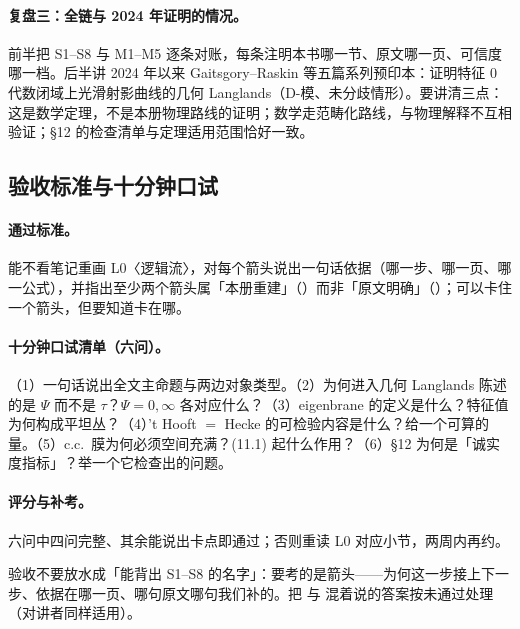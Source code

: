 {\paragraph{复盘三：全链与 2024 年证明的情况。}前半把 S1--S8 与 M1--M5 逐条对账，每条注明本书哪一节、原文哪一页、可信度哪一档。后半讲 2024 年以来 Gaitsgory--Raskin 等五篇系列预印本：证明特征 \(0\) 代数闭域上光滑射影曲线的几何 Langlands（D-模、未分歧情形）。要讲清三点：这是数学定理，不是本册物理路线的证明；数学走范畴化路线，与物理解释不互相验证；§12 的检查清单与定理适用范围恰好一致。\pC

\subsection{验收标准与十分钟口试}

\paragraph{通过标准。}能不看笔记重画 L0〈逻辑流〉，对每个箭头说出一句话依据（哪一步、哪一页、哪一公式），并指出至少两个箭头属「本册重建」（\pB）而非「原文明确」（\pA）；可以卡住一个箭头，但要知道卡在哪。\pC

\paragraph{十分钟口试清单（六问）。}（1）一句话说出全文主命题与两边对象类型。（2）为何进入几何 Langlands 陈述的是 \(\Psi\) 而不是 \(\tau\)？\(\Psi=0,\infty\) 各对应什么？（3）eigenbrane 的定义是什么？特征值为何构成平坦丛？（4）'t Hooft \(=\) Hecke 的可检验内容是什么？给一个可算的量。（5）c.c.\ 膜为何必须空间充满？(11.1) 起什么作用？（6）§12 为何是「诚实度指标」？举一个它检查出的问题。\pC

\paragraph{评分与补考。}六问中四问完整、其余能说出卡点即通过；否则重读 L0 对应小节，两周内再约。\pC

\begin{warn}
验收不要放水成「能背出 S1--S8 的名字」：要考的是箭头——为何这一步接上下一步、依据在哪一页、哪句原文哪句我们补的。把 \pA 与 \pB 混着说的答案按未通过处理（对讲者同样适用）。\pC
\end{warn}
}%
